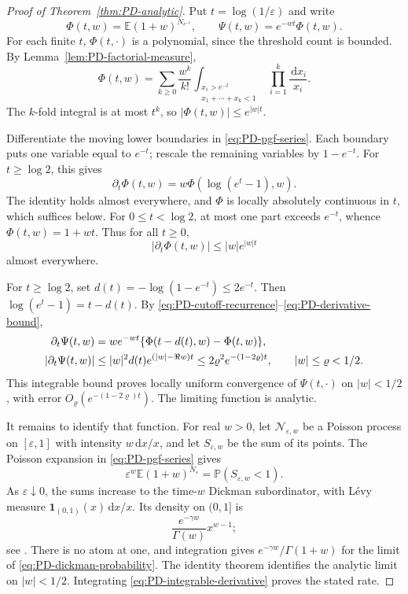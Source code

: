 \documentclass[11pt]{article}
\numberwithin{equation}{section}
\newcommand{\E}{\mathbb E}
\newcommand{\Pp}{\mathbb P}
\newcommand{\one}{\mathbf 1}
\newcommand{\dd}{\,\mathrm d}
\newcommand{\eps}{\varepsilon}
\theoremstyle{definition}
\theoremstyle{remark}
\begin{document}
\begin{proof}[Proof of Theorem~\ref{thm:PD-analytic}]
Put $t=\log(1/\eps)$ and write
\[
 \Phi(t,w)=\E(1+w)^{N_{e^{-t}}},\qquad
 \Psi(t,w)=e^{-wt}\Phi(t,w).
\]
For each finite $t$, $\Phi(t,\cdot)$ is a polynomial, since the threshold
count is bounded.  By Lemma~\ref{lem:PD-factorial-measure},
\begin{equation}\label{eq:PD-pgf-series}
 \Phi(t,w)=\sum_{k\ge0}\frac{w^k}{k!}
 \int_{\substack{x_i>e^{-t}\\x_1+\cdots+x_k<1}}
 \prod_{i=1}^k\frac{\dd x_i}{x_i}.
\end{equation}
The $k$-fold integral is at most $t^k$, so
$|\Phi(t,w)|\le e^{|w|t}$.

Differentiate the moving lower boundaries in
\eqref{eq:PD-pgf-series}.  Each boundary puts one variable equal to
$e^{-t}$; rescale the remaining variables by $1-e^{-t}$.
For $t\ge\log2$, this gives
\begin{equation}\label{eq:PD-cutoff-recurrence}
 \partial_t\Phi(t,w)=w\Phi(\log(e^t-1),w).
\end{equation}
The identity holds almost everywhere, and $\Phi$ is locally absolutely
continuous in $t$, which suffices below.  For $0\le t<\log2$, at most one
part exceeds $e^{-t}$, whence $\Phi(t,w)=1+wt$.
Thus for all $t\ge0$,
\begin{equation}\label{eq:PD-derivative-bound}
 |\partial_t\Phi(t,w)|\le |w|e^{|w|t}
\end{equation}
almost everywhere.

For $t\ge\log2$, set $d(t)=-\log(1-e^{-t})\le2e^{-t}$.  Then
$\log(e^t-1)=t-d(t)$.  By
\eqref{eq:PD-cutoff-recurrence}--\eqref{eq:PD-derivative-bound},
\begin{align}
 \partial_t\Psi(t,w)
 &=we^{-wt}\{\Phi(t-d(t),w)-\Phi(t,w)\},\notag\\
 |\partial_t\Psi(t,w)|
 &\le |w|^2d(t)e^{(|w|-\Re w)t}
 \le2\varrho^2e^{-(1-2\varrho)t},\qquad |w|\le\varrho<1/2.
 \label{eq:PD-integrable-derivative}
\end{align}
This integrable bound proves locally uniform convergence of
$\Psi(t,\cdot)$ on $|w|<1/2$, with error $O_\varrho(e^{-(1-2\varrho)t})$.
The limiting function is analytic.

It remains to identify that function.  For real $w>0$, let
$\mathcal N_{\eps,w}$ be a Poisson process on $[\eps,1]$ with intensity
$w\dd x/x$, and let $S_{\eps,w}$ be the sum of its points.
The Poisson expansion in \eqref{eq:PD-pgf-series} gives
\begin{equation}\label{eq:PD-dickman-probability}
 \eps^w\E(1+w)^{N_\eps}=\Pp(S_{\eps,w}<1).
\end{equation}
As $\eps\downarrow0$, the sums increase to the time-$w$ Dickman
subordinator, with L\'evy measure $\one_{(0,1)}(x)\dd x/x$.
Its density on $(0,1]$ is
\[
 \frac{e^{-\gamma w}}{\Gamma(w)}x^{w-1};
\]
see \cite[Theorem~1.1]{CaravennaSunZygouras2019}.
There is no atom at one, and integration gives
$e^{-\gamma w}/\Gamma(1+w)$ for the limit of
\eqref{eq:PD-dickman-probability}.
The identity theorem identifies the analytic limit on $|w|<1/2$.
Integrating \eqref{eq:PD-integrable-derivative} proves the stated rate.
\end{proof}
\end{document}
